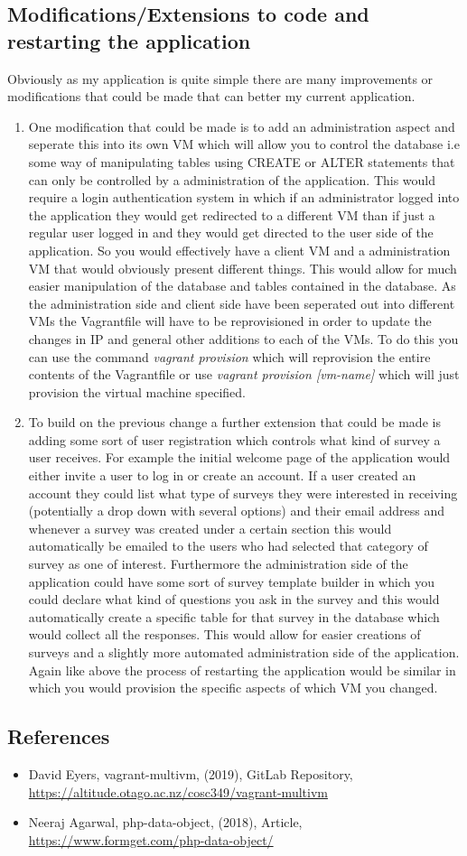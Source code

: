 \documentclass[12pt, article, oneside]{article}
\begin{document}
\subsection{Modifications/Extensions to code and restarting the application}
Obviously as my application is quite simple there are many improvements or modifications that could be made that can better my current application.
\begin{enumerate}
\item One modification that could be made is to add an administration aspect and seperate this into its own VM which will allow you to control the database i.e some way of manipulating tables using CREATE or ALTER statements that can only be controlled by a administration of the application. This would require a login authentication system in which if an administrator logged into the application they would get redirected to a different VM than if just a regular user logged in and they would get directed to the user side of the application. So you would effectively have a client VM and a administration VM that would obviously present different things. This would allow for much easier manipulation of the database and tables contained in the database. As the administration side and client side have been seperated out into different VMs the Vagrantfile will have to be reprovisioned in order to update the changes in IP and general other additions to each of the VMs. To do this you can use the command \textit {vagrant provision} which will reprovision the entire contents of the Vagrantfile or use \textit{vagrant provision [vm-name]} which will just provision the virtual machine specified.
\item To build on the previous change a further extension that could be made is adding some sort of user registration which controls what kind of survey a user receives. For example the initial welcome page of the application would either invite a user to log in or create an account. If a user created an account they could list what type of surveys they were interested in receiving (potentially a drop down with several options) and their email address and whenever a survey was created under a certain section this would automatically be emailed to the users who had selected that category of survey as one of interest. Furthermore the administration side of the application could have some sort of survey template builder in which you could declare what kind of questions you ask in the survey and this would automatically create a specific table for that survey in the database which would collect all the responses. This would allow for easier creations of surveys and a slightly more automated administration side of the application. Again like above the process of restarting the application would be similar in which you would provision the specific aspects of which VM you changed. 
\end{enumerate}
\subsection{References}
\begin{itemize}
  \item David Eyers, vagrant-multivm, (2019), GitLab Repository, \url {https://altitude.otago.ac.nz/cosc349/vagrant-multivm}
  \item Neeraj Agarwal, php-data-object, (2018), Article, \url{https://www.formget.com/php-data-object/}
\end{itemize}
\end{document}
